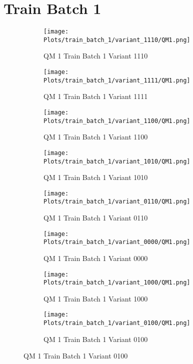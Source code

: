 \documentclass{DissertateFigs}
\begin{document}
\section{Train Batch 1}
\begin{figure}[t!]
    \begin{subfigure}{0.47\textwidth}
    \texttt{[image: Plots/train\_batch\_1/variant\_1110/QM1.png]}
    \caption{QM 1 Train Batch 1 Variant 1110}
    \end{subfigure}
    \begin{subfigure}{0.47\textwidth}
    \texttt{[image: Plots/train\_batch\_1/variant\_1111/QM1.png]}
    \caption{QM 1 Train Batch 1 Variant 1111}
    \end{subfigure}

\medskip

    \begin{subfigure}{0.47\textwidth}
    \texttt{[image: Plots/train\_batch\_1/variant\_1100/QM1.png]}
    \caption{QM 1 Train Batch 1 Variant 1100}
    \end{subfigure}
    \begin{subfigure}{0.47\textwidth}
    \texttt{[image: Plots/train\_batch\_1/variant\_1010/QM1.png]}
    \caption{QM 1 Train Batch 1 Variant 1010}
    \end{subfigure}

\medskip

    \begin{subfigure}{0.47\textwidth}
    \texttt{[image: Plots/train\_batch\_1/variant\_0110/QM1.png]}
    \caption{QM 1 Train Batch 1 Variant 0110}
    \end{subfigure}
    \begin{subfigure}{0.47\textwidth}
    \texttt{[image: Plots/train\_batch\_1/variant\_0000/QM1.png]}
    \caption{QM 1 Train Batch 1 Variant 0000}
    \end{subfigure}

\medskip

    \begin{subfigure}{0.47\textwidth}
    \texttt{[image: Plots/train\_batch\_1/variant\_1000/QM1.png]}
    \caption{QM 1 Train Batch 1 Variant 1000}
    \end{subfigure}
    \begin{subfigure}{0.47\textwidth}
    \texttt{[image: Plots/train\_batch\_1/variant\_0100/QM1.png]}
    \caption{QM 1 Train Batch 1 Variant 0100}
    \end{subfigure}


\end{figure}
\end{document}
